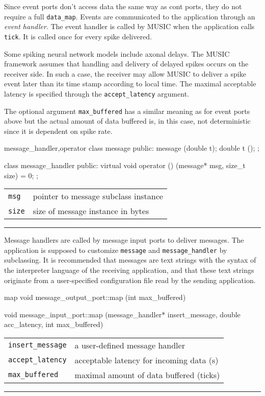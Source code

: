 \documentclass[a4paper]{report}
\makeatletter
\newenvironment{parameters}%
{\begin{tabular}{@{\hspace{2em}}lp{0.6\textwidth}}}%
{\end{tabular}\par\vspace{1mm}\par\hrule\par\vspace{5mm}}
\makeatother
\begin{document}
Since event ports don't access data the same way as cont ports, they
do not require a full \lstinline|data_map|.  Events are communicated
to the application through an \emph{event handler}.  The event handler is called by MUSIC when the application
calls \lstinline|tick|.  It is called once for every spike delivered.

Some spiking neural network models include axonal delays.  The MUSIC
framework assumes that handling and delivery of delayed spikes occurs
on the receiver side.  In such a case, the receiver may allow MUSIC to
deliver a spike event later than its time stamp according to local
time.  The maximal acceptable latency is specified through the
\lstinline|accept_latency| argument.

The optional argument \lstinline|max_buffered| has a similar meaning
as for event ports above but the actual amount of data buffered is, in
this case, not deterministic since it is dependent on spike rate.
  
\begin{head}{message_handler,operator}
  class message {
   public:
    message (double t);
    double t ();
  };

  class message_handler {
  public:
    virtual void operator () (message* msg, size_t size) = 0;
  };
\end{head}
\begin{parameters}
  \lstinline|msg| & pointer to message subclass instance \\
  \lstinline|size| & size of message instance in bytes \\
\end{parameters}
  
Message handlers are called by message input ports to deliver
messages.  The application is supposed to customize
\lstinline|message| and \lstinline|message_handler| by subclassing.
It is recommended that messages are text strings with the syntax of
the interpreter language of the receiving application, and that these
text strings originate from a user-specified configuration file read
by the sending application.

\begin{head}{map}
  void message_output_port::map (int max_buffered)

  void message_input_port::map (message_handler* insert_message,
                                double acc_latency,
                                int max_buffered)
\end{head}
\begin{parameters}
  \lstinline|insert_message| & a user-defined message handler \\
  \lstinline|accept_latency| & acceptable latency for incoming data (s) \\
  \lstinline|max_buffered| & maximal amount of data buffered (ticks) \\
\end{parameters}
\end{document}
